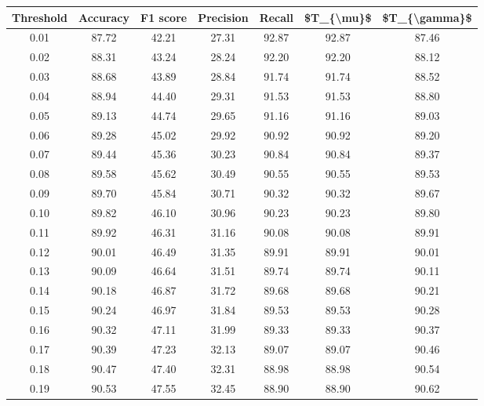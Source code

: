\begin{tabular}{|c|c|c|c|c|c|c|}
\hline
 Threshold &  Accuracy &  F1 score &  Precision &  Recall &  \$T\_\{\textbackslash mu\}\$ &  \$T\_\{\textbackslash gamma\}\$ \\
\hline
      0.01 &     87.72 &     42.21 &      27.31 &   92.87 &      92.87 &         87.46 \\
      0.02 &     88.31 &     43.24 &      28.24 &   92.20 &      92.20 &         88.12 \\
      0.03 &     88.68 &     43.89 &      28.84 &   91.74 &      91.74 &         88.52 \\
      0.04 &     88.94 &     44.40 &      29.31 &   91.53 &      91.53 &         88.80 \\
      0.05 &     89.13 &     44.74 &      29.65 &   91.16 &      91.16 &         89.03 \\
      0.06 &     89.28 &     45.02 &      29.92 &   90.92 &      90.92 &         89.20 \\
      0.07 &     89.44 &     45.36 &      30.23 &   90.84 &      90.84 &         89.37 \\
      0.08 &     89.58 &     45.62 &      30.49 &   90.55 &      90.55 &         89.53 \\
      0.09 &     89.70 &     45.84 &      30.71 &   90.32 &      90.32 &         89.67 \\
      0.10 &     89.82 &     46.10 &      30.96 &   90.23 &      90.23 &         89.80 \\
      0.11 &     89.92 &     46.31 &      31.16 &   90.08 &      90.08 &         89.91 \\
      0.12 &     90.01 &     46.49 &      31.35 &   89.91 &      89.91 &         90.01 \\
      0.13 &     90.09 &     46.64 &      31.51 &   89.74 &      89.74 &         90.11 \\
      0.14 &     90.18 &     46.87 &      31.72 &   89.68 &      89.68 &         90.21 \\
      0.15 &     90.24 &     46.97 &      31.84 &   89.53 &      89.53 &         90.28 \\
      0.16 &     90.32 &     47.11 &      31.99 &   89.33 &      89.33 &         90.37 \\
      0.17 &     90.39 &     47.23 &      32.13 &   89.07 &      89.07 &         90.46 \\
      0.18 &     90.47 &     47.40 &      32.31 &   88.98 &      88.98 &         90.54 \\
      0.19 &     90.53 &     47.55 &      32.45 &   88.90 &      88.90 &         90.62 \\

\end{tabular}
